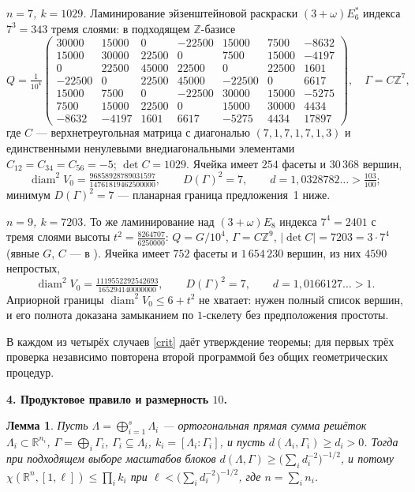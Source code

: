 \documentclass{article}
\newcommand{\R}{\mathbb{R}}
\newcommand{\Z}{\mathbb{Z}}
\newcommand{\diam}{\operatorname{diam}}
\newtheorem{lemma}{Лемма}
\begin{document}
\emph{$n=7$, $k=1029$.} Ламинирование эйзенштейновой раскраски
$(3+\omega)E_6^*$ индекса $7^3=343$ тремя слоями: в подходящем $\Z$-базисе
\[
Q=\tfrac1{10^4}\begin{pmatrix}
30000&15000&0&-22500&15000&7500&-8632\\
15000&30000&22500&0&7500&15000&-4197\\
0&22500&45000&22500&0&22500&1601\\
-22500&0&22500&45000&-22500&0&6617\\
15000&7500&0&-22500&30000&15000&-5275\\
7500&15000&22500&0&15000&30000&4434\\
-8632&-4197&1601&6617&-5275&4434&17897
\end{pmatrix},
\quad
\Gamma=C\Z^7,
\]
где $C$ --- верхнетреугольная матрица с диагональю $(7,1,7,1,7,1,3)$ и
единственными ненулевыми внедиагональными элементами
$C_{12}=C_{34}=C_{56}=-5$; $\det C=1029$. Ячейка имеет $254$ фасеты и
$30\,368$ вершин,
\[
\diam^2V_0=\tfrac{96858928789031597}{14761819462500000},\qquad
D(\Gamma)^2=7,\qquad
d=1{,}0328782\ldots>\tfrac{103}{100};
\]
минимум $D(\Gamma)^2=7$ --- планарная граница предложения~1 ниже.

\emph{$n=9$, $k=7203$.} То же ламинирование над $(3+\omega)E_8$ индекса
$7^4=2401$ с тремя слоями высоты $t^2=\tfrac{8264707}{6250000}$: $Q=G/10^4$,
$\Gamma=C\Z^9$, $|\det C|=7203=3\cdot7^4$ (явные $G$, $C$ --- в \cite{Full}).
Ячейка имеет $752$ фасеты и $1\,654\,230$ вершин, из них $4590$ непростых,
\[
\diam^2V_0=\tfrac{1119552292542693}{165294140000000},\qquad
D(\Gamma)^2=7,\qquad d=1{,}0166127\ldots>1 .
\]
Априорной границы $\diam^2V_0\le6+t^2$ не хватает: нужен полный список вершин,
и его полнота доказана замыканием по $1$-скелету без предположения простоты.

В каждом из четырёх случаев \eqref{crit} даёт утверждение теоремы; для первых
трёх проверка независимо повторена второй программой без общих геометрических
процедур.

\textbf{4. Продуктовое правило и размерность $10$.}

\begin{lemma}
Пусть $\Lambda=\bigoplus_{i=1}^{s}\Lambda_i$ --- ортогональная прямая сумма
решёток $\Lambda_i\subset\R^{n_i}$, $\Gamma=\bigoplus_i\Gamma_i$,
$\Gamma_i\subseteq\Lambda_i$, $k_i=[\Lambda_i:\Gamma_i]$, и пусть
$d(\Lambda_i,\Gamma_i)\ge d_i>0$. Тогда при подходящем выборе масштабов
блоков $d(\Lambda,\Gamma)\ge\bigl(\sum_{i}d_i^{-2}\bigr)^{-1/2}$, и потому
$\chi(\R^{n},[1,\ell])\le\prod_i k_i$ при
$\ell<\bigl(\sum_{i}d_i^{-2}\bigr)^{-1/2}$, где $n=\sum_i n_i$.
\end{lemma}
\end{document}
